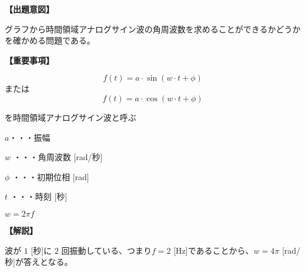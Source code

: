 \noindent \textbf{【出題意図】}

\noindent グラフから時間領域アナログサイン波の角周波数を求めることができるかどうかを確かめる問題である。

\vspace{1em}
\noindent \textbf{【重要事項】}

\[
f(t) = a \cdot \sin( w \cdot t + \phi )
\]
%
\noindent または
%
\[
f(t) = a \cdot \cos( w \cdot t + \phi )
\]

\medskip
\noindent を時間領域アナログサイン波と呼ぶ

\bigskip
\noindent $a$・・・振幅

\bigskip
\noindent $w$ ・・・角周波数 [rad/秒]

\bigskip
\noindent $\phi$ ・・・初期位相 [rad]

\bigskip
\noindent $t$ ・・・時刻 [秒]

\bigskip
$w = 2\pi f$

\vspace{1em}
\noindent \textbf{【解説】}

\noindent 波が $1$ [秒]に $2$ 回振動している、つまり$f=2$ [Hz]であることから、$w = 4\pi$ [rad/秒]が答えとなる。

